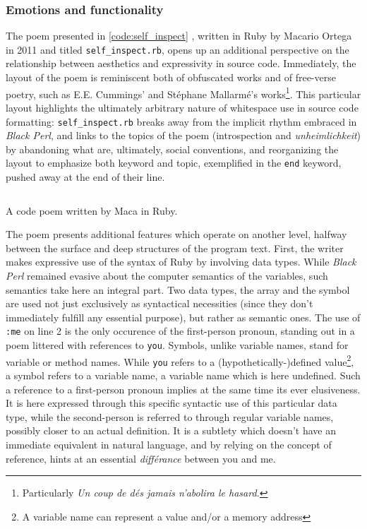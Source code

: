 \subsubsection{Emotions and functionality}
\label{subsubsec:emotions-functionality}

The poem presented in \ref{code:self_inspect} , written in Ruby by Macario Ortega in 2011 and titled \lstinline{self_inspect.rb}, opens up an additional perspective on the relationship between aesthetics and expressivity in source code. Immediately, the layout of the poem is reminiscent both of obfuscated works and of free-verse poetry, such as E.E. Cummings' and Stéphane Mallarmé's works\footnote{Particularly \emph{Un coup de dés jamais n'abolira le hasard.}}. This particular layout highlights the ultimately arbitrary nature of whitespace use in source code formatting: \lstinline{self_inspect.rb} breaks away from the implicit rhythm embraced in \emph{Black Perl}, and links to the topics of the poem (introspection and \emph{unheimlichkeit}) by abandoning what are, ultimately, social conventions, and reorganizing the layout to emphasize both keyword and topic, exemplified in the \lstinline{end} keyword, pushed away at the end of their line.

\begin{listing}
  \inputminted{ruby}{./corpus/self_inspect.rb}
  \caption{A code poem written by Maca in Ruby. \citep{ortega_maca_2011}}
  \label{code:self_inspect}
\end{listing}

The poem presents additional features which operate on another level, halfway between the surface and deep structures of the program text. First, the writer makes expressive use of the syntax of Ruby by involving data types. While \emph{Black Perl} remained evasive about the computer semantics of the variables, such semantics take here an integral part. Two data types, the array and the symbol are used not just exclusively as syntactical necessities (since they don't immediately fulfill any essential purpose), but rather as semantic ones. The use of \lstinline{:me} on line 2 is the only occurence of the first-person pronoun, standing out in a poem littered with references to \lstinline{you}. Symbols, unlike variable names, stand for variable or method names. While \lstinline{you} refers to a (hypothetically-)defined value\footnote{A variable name can represent a value and/or a memory address}, a symbol refers to a variable name, a variable name which is here undefined. Such a reference to a first-person pronoun implies at the same time its ever elusiveness. It is here expressed through this specific syntactic use of this particular data type, while the second-person is referred to through regular variable names, possibly closer to an actual definition. It is a subtlety which doesn't have an immediate equivalent in natural language, and by relying on the concept of reference, hints at an essential \emph{différance} between you and me.

